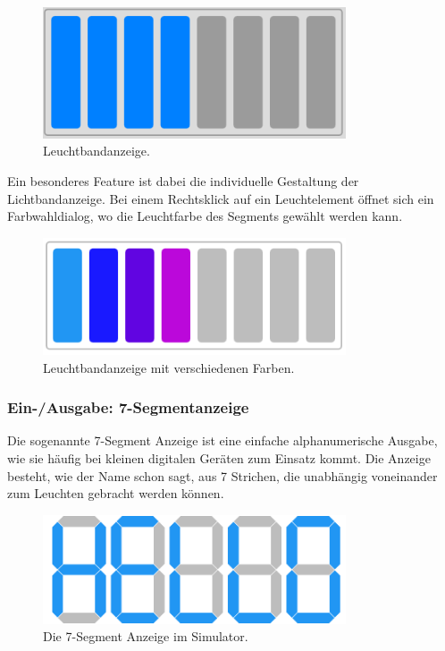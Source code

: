 \begin{figure}[ht]
	\centering
  \includegraphics[width=0.8\textwidth]{Images/Lightstrip}
	\caption{Leuchtbandanzeige.}
	\label{Lightstrip}
\end{figure}

Ein besonderes Feature ist dabei die individuelle Gestaltung der
Lichtbandanzeige. Bei einem Rechtsklick auf ein Leuchtelement öffnet sich ein
Farbwahldialog, wo die Leuchtfarbe des Segments gewählt werden kann.

\begin{figure}[ht]
	\centering
  \includegraphics[width=0.8\textwidth]{Images/Lightstrip_colors}
	\caption{Leuchtbandanzeige mit verschiedenen Farben.}
	\label{Lightstrip_Colors}
\end{figure}


\subsubsection{Ein-/Ausgabe: 7-Segmentanzeige}
Die sogenannte 7-Segment Anzeige ist eine einfache alphanumerische Ausgabe, wie
sie häufig bei kleinen digitalen Geräten zum Einsatz kommt. Die Anzeige besteht, wie
der Name schon sagt, aus 7 Strichen, die unabhängig voneinander zum Leuchten
gebracht werden können.

\begin{figure}[ht]
	\centering
  \includegraphics[width=0.8\textwidth]{Images/7-Segment_Hello}
	\caption{Die 7-Segment Anzeige im Simulator.}
	\label{7-Segment}
\end{figure}

